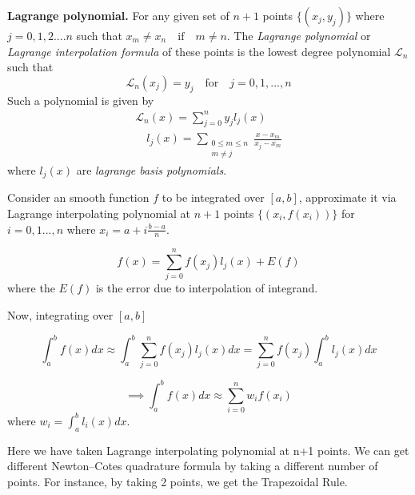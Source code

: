 \documentclass[../document.tex]{subfiles}
\begin{document}
	\begin{simp_num}{\normalfont\textbf{Lagrange polynomial.}} For any given set of $n+1$ points $\{  (x_j,y_j)   \}$ where $j= 0,1,2 .... n$ such that 
		$x_m \neq x_n \quad \text{if} \quad m \neq n$. The \emph{Lagrange
			polynomial} or \emph{Lagrange interpolation formula} of these points is the lowest degree polynomial $\mathcal{L}_n$ such that
		$$
		\mathcal{L}_n(x_j) = y_j 
		\quad \text{for} \quad 
		j = 0,1 , ... ,n
		$$
		Such a polynomial is given by 
		\begin{equation} \label{Lagrange_interpolation_formula}
			\begin{split}
				\mathcal{L}_n(x) = \sum_{j=0}^{n} y_j l_j(x) \\
				\quad l_j(x) = 
				\sum_{\substack{  	0 \leq m \leq n \\m \neq j  } } 
				\frac{x - x_m}{x_j - x_m}
			\end{split}
		\end{equation}
		where $l_j(x)$ are \emph{lagrange basis polynomials}.
		
	\end{simp_num}
	
	Consider an smooth function $f$ to be integrated over $[a,b]$, approximate it via Lagrange interpolating polynomial at $n+1$ points $\{(x_i,f(x_i))\}$ for $i = 0 ,1 ...,n$ where
	$x_i = a + i\frac{b-a}{n}$.
	
	$$
	f(x) = \sum_{j=0}^{n} f(x_j) l_j(x) + E(f) 
	$$
	where the $E(f)$ is the error due to interpolation of integrand.
	
	Now, integrating over $[a,b]$
	
	\begin{equation*}
		\int_a^b f(x)dx \approx \int_a^b  \sum_{j=0}^{n} f(x_j) l_j(x) dx
		= \sum_{j=0}^{n}  f(x_j)  \int_a^b l_j(x)dx 
	\end{equation*}
	
	\begin{equation} \label{quadrature}
		\implies \int_a^b f(x)dx  \approx \sum_{i=0}^n w_i f(x_i)
	\end{equation}
	where $w_i = \int_a^b l_i(x)dx$.
	
	Here we have taken Lagrange interpolating polynomial at n+1 points. We can get different Newton–Cotes quadrature formula by taking a different number of points. For instance, by taking 2 points, we get the Trapezoidal Rule.
	
\end{document}
